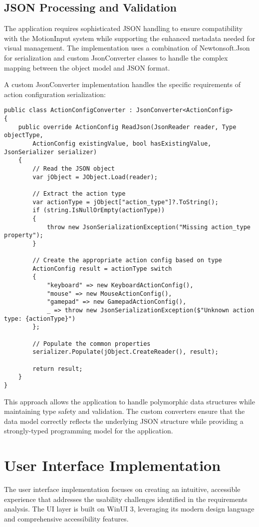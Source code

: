 \subsection{JSON Processing and Validation}
The application requires sophisticated JSON handling to ensure compatibility with the MotionInput system while supporting the enhanced metadata needed for visual management. The implementation uses a combination of Newtonsoft.Json for serialization and custom JsonConverter classes to handle the complex mapping between the object model and JSON format.

A custom JsonConverter implementation handles the specific requirements of action configuration serialization:

\begin{verbatim}
public class ActionConfigConverter : JsonConverter<ActionConfig>
{
    public override ActionConfig ReadJson(JsonReader reader, Type objectType, 
        ActionConfig existingValue, bool hasExistingValue, JsonSerializer serializer)
    {
        // Read the JSON object
        var jObject = JObject.Load(reader);
        
        // Extract the action type
        var actionType = jObject["action_type"]?.ToString();
        if (string.IsNullOrEmpty(actionType))
        {
            throw new JsonSerializationException("Missing action_type property");
        }
        
        // Create the appropriate action config based on type
        ActionConfig result = actionType switch
        {
            "keyboard" => new KeyboardActionConfig(),
            "mouse" => new MouseActionConfig(),
            "gamepad" => new GamepadActionConfig(),
            _ => throw new JsonSerializationException($"Unknown action type: {actionType}")
        };
        
        // Populate the common properties
        serializer.Populate(jObject.CreateReader(), result);
        
        return result;
    }
}
\end{verbatim}

This approach allows the application to handle polymorphic data structures while maintaining type safety and validation. The custom converters ensure that the data model correctly reflects the underlying JSON structure while providing a strongly-typed programming model for the application.

\section{User Interface Implementation}
The user interface implementation focuses on creating an intuitive, accessible experience that addresses the usability challenges identified in the requirements analysis. The UI layer is built on WinUI 3, leveraging its modern design language and comprehensive accessibility features.

